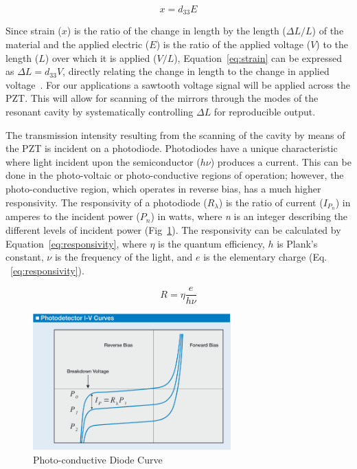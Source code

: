 \documentclass[12pt,journal]{IEEEtran}
\begin{document}
\begin{equation}
x = d_{33}E
\label{eq:strain}
\end{equation}   

Since strain ($x$) is the ratio of the change in length by the length ($\Delta L/L$) of the material and the applied electric ($E$) is the ratio of the applied voltage ($V$) to the length ($L$) over which it is applied ($V/L$), Equation~\ref{eq:strain} can be expressed as $\Delta L = d_{33}V$, directly relating the change in length to the change in applied voltage~\cite{piezo}. For our applications a sawtooth voltage signal will be applied across the PZT. This will allow for scanning of the mirrors through the modes of the resonant cavity by systematically controlling $\Delta L$ for reproducible output. 

The transmission intensity resulting from the scanning of the cavity by means of the PZT is incident on a photodiode. Photodiodes have a unique characteristic where light incident upon the semiconductor ($h\nu$) produces a current. This can be done in the photo-voltaic or photo-conductive regions of operation; however, the photo-conductive region, which operates in reverse bias, has a much higher responsivity. The responsivity of a photodiode ($R_{\lambda}$) is the ratio of current ($I_{P_n}$) in amperes to the incident power ($P_n$) in watts, where \textit{n} is an integer describing the different levels of incident power (Fig~\ref{fig:diode-curve}). The responsivity can be calculated by Equation~\ref{eq:responsivity}, where $\eta$ is the quantum efficiency, $h$ is Plank's constant, $\nu$ is the frequency of the light, and $e$ is the elementary charge (Eq. ~\ref{eq:responsivity}).    

\begin{equation}
R = \eta \frac{e}{h\nu}
\label{eq:responsivity}
\end{equation} 

\begin{figure}[h!]
	\centering
	\includegraphics[width=3in]{diode-curve.png}
	\caption{Photo-conductive Diode Curve~\cite{diode-curve}}
	\label{fig:diode-curve}
\end{figure}  
\end{document}
